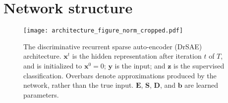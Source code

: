 \documentclass{article} %
\newcommand{\bv}{\mathbf{b}}
\newcommand{\x}{\mathbf{x}}
\newcommand{\y}{\mathbf{y}}
\newcommand{\D}{\mathbf{D}}
\newcommand{\E}{\mathbf{E}}
\newcommand{\Sm}{\mathbf{S}}
\begin{document}
\begin{comment}
Unlike contractive autoencoders \citep{rifai2011a} or tangent propagation \citep{simard1993}, the selected template is represented explicitly, facilitating natural and accurate classification.  This is potentially useful, in datapoints belonging to different classes may be composed of a common set of parts.  Indeed, it is often the case that the manifolds corresponding to two different classes touch.  For instance, it is possible to continuously deform a 4 into a 9 while remaining on the data manifold.  The tangent distance provides a consistent and intuitive way to deal with ambiguous points near the intersection of two manifolds.  Tangent propagation alone provides no a priori information about how to deal with these points.  Just as contractive autoencoders extend tangent propagation by requiring that the input distribution be modeled while minimizing the volatility of the output in all directions (and thus certainly in directions of allowed deformations), our networks induce the usage of a particularly natural and informative hidden representation.  
\end{comment}



\section{Network structure}

\begin{figure}[tb]
  \begin{center}
    \texttt{[image: architecture\_figure\_norm\_cropped.pdf]}
  \end{center}
  \caption{The discriminative recurrent sparse auto-encoder (DrSAE) architecture.  $\x^t$ is the hidden representation after iteration $t$ of $T$, and is initialized to $\x^0 = 0$; $\y$ is the input; and $\mathbf{z}$ is the supervised classification.  Overbars denote approximations produced by the network, rather than the true input.  $\E$, $\Sm$, $\D$, and $\bv$ are learned parameters.  \label{architecture_figure}} 
\end{figure}
\end{document}
